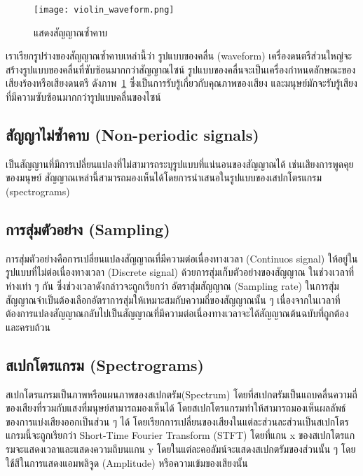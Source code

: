 \begin{figure}[h]
    \centering
    \texttt{[image: violin\_waveform.png]}
    \caption{แสดงสัญญาณซ้ำคาบ}
    \label{Fig:Periodic_signal}
\end{figure}

เราเรียกรูปร่างของสัญญาณซ้ำคาบเหล่านี้ว่า รูปแบบของคลื่น (waveform) เครื่องดนตรีส่วนใหญ่จะสร้างรูปแบบของคลื่นที่ซับซ้อนมากกว่าสัญญาณไซน์ 
รูปแบบของคลื่นจะเป็นเครื่องกำหนดลักษณะของเสียงร้องหรือเสียงดนตรี ดังภาพ~\ref{Fig:Periodic_signal} ซึ่งเป็นการรับรู้เกี่ยวกับคุณภาพของเสียง 
และมนุษย์มักจะรับรู้เสียงที่มีความซับซ้อนมากกว่ารูปแบบคลื่นของไซน์ 

\subsection{สัญญาไม่ซ้ำคาบ (Non-periodic signals)}
เป็นสัญญานที่มีการเปลี่ยนแปลงที่ไม่สามารถระบุรูปแบบที่แน่นอนของสัญญาณได้ เช่นเสียงการพูดคุยของมนุษย์ 
สัญญาณเหล่านี้สามารถมองเห็นได้โดยการนำเสนอในรูปแบบของเสปกโตรแกรม (spectrograms)

\subsection{การสุ่มตัวอย่าง (Sampling)}
การสุ่มตัวอย่างคือการเปลี่ยนแปลงสัญญาณที่มีความต่อเนื่องทางเวลา (Continuos signal) ให้อยู่ในรูปแบบที่ไม่ต่อเนื่องทางเวลา (Discrete signal) ด้วยการสุ่มเก็บตัวอย่างของสัญญาณ
ในช่วงเวลาที่ห่างเท่า ๆ กัน ซึ่งช่วงเวลาดังกล่าวจะถูกเรียกว่า อัตราสุ่มสัญญาณ (Sampling rate) ในการสุ่มสัญญาณจำเป็นต้องเลือกอัตราการสุ่มให้เหมาะสมกับความถี่ของสัญญาณนั้น ๆ
เนื่องจากในเวลาที่ต้องการแปลงสัญญาณกลับไปเป็นสัญญาณที่มีความต่อเนื่องทางเวลาจะได้สัญญาณต้นฉบับที่ถูกต้องและครบถ้วน~\cite{AT1987}

\subsection{สเปกโตรแกรม (Spectrograms)}
สเปกโตรแกรมเป็นภาพหรือแผนภาพของสเปกตรัม(Spectrum) โดยที่สเปกตรัมเป็นแถบคลื่นความถี่ของเสียงที่รวมกับแสงที่มนุษย์สามารถมองเห็นได้ 
โดยสเปกโตรแกรมทำให้สามารถมองเห็นผลลัพธ์ของการแบ่งเสียงออกเป็นส่วน ๆ ได้ โดยเรียกการเปลี่ยนของเสียงในแต่ละส่วนละส่วนเป็นสเปกโตรแกรมนี้จะถูกเรียกว่า Short-Time Fourier Transform (STFT)
โดยที่แกน x ของสเปกโตรแกรมจะแสดงเวลาและแสดงความถีบนแกน y โดยในแต่ละคอลัมน์จะแสดงสเปกตรัมของส่วนนั้น ๆ โดยใช้สีในการแสดงแอมพลิจูด (Amplitude) หรือความเข้มของเสียงนั้น

